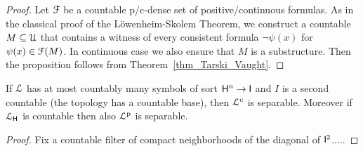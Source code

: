 \documentclass{amsproc}
\newcommand{\mylabel}[1]{{#1}\hfill}
\renewenvironment{itemize}
  {\begin{list}{$\triangleright$}{%
  \setlength{\parskip}{0mm}
  \setlength{\topsep}{.4\baselineskip}
  \setlength{\rightmargin}{0mm}
  \setlength{\listparindent}{0mm}
  \setlength{\itemindent}{0mm}
  \setlength{\labelwidth}{3ex}
  \setlength{\itemsep}{.2\baselineskip}
  \setlength{\parsep}{.2\baselineskip}
  \setlength{\partopsep}{0mm}
  \setlength{\labelsep}{1ex}
  \setlength{\leftmargin}{\labelwidth+\labelsep}
  \let\makelabel\mylabel}}{%
\end{list}}
\renewcommand*{\emph}[1]{%
   \smash{\tikz[baseline]\node[rectangle, fill=teal!25, rounded corners, inner xsep=0.5ex, inner ysep=0.2ex, anchor=base, minimum height = 2.7ex]{\strut #1};}}
\begin{document}
{\begin{proof}
  Let ${\EuScript F}$ be a countable p/c-dense set of positive/continuous formulas.
  As in the classical proof of the L\"owenheim-Skolem Theorem, we construct a countable $M\subseteq{\EuScript U}$ that contains a witness of every consistent formula $\neg\psi(x)$ for $\psi(x)\in{\EuScript F}(M)$.
  In continuous case we also ensure that $M$ is a substructure.
  Then the proposition follows from Theorem~\ref{thm_Tarski_Vaught}.
\end{proof}

\begin{proposition}
  If ${\EuScript L}$ has at most countably many symbols of sort ${\sf H}^n\to {\sf I}$ and $I$ is a second countable (the topology has a countable base), then ${\EuScript L}^{\rm c}$ is separable.
  Moreover if ${\EuScript L}_{\sf H}$ is countable then also ${\EuScript L}^{\rm p}$ is separable.
\end{proposition}

\begin{proof}
  Fix a countable filter of compact neighborhoods of the diagonal of ${\sf I}^2$.....  
\end{proof}











}
\end{document}
